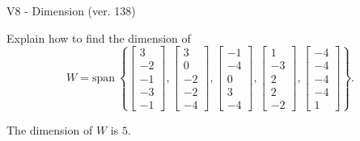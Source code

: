 \begin{exercise}
  \begin{exerciseTitle}V8 - Dimension (ver. 138)\end{exerciseTitle}
  \begin{exerciseStatement}
    Explain how to find the dimension of 
\[W=\mathrm{span}\ \left\{\left[\begin{array}{r}
3 \\
-2 \\
-1 \\
-3 \\
-1
\end{array}\right] , \left[\begin{array}{r}
3 \\
0 \\
-2 \\
-2 \\
-4
\end{array}\right] , \left[\begin{array}{r}
-1 \\
-4 \\
0 \\
3 \\
-4
\end{array}\right] , \left[\begin{array}{r}
1 \\
-3 \\
2 \\
2 \\
-2
\end{array}\right] , \left[\begin{array}{r}
-4 \\
-4 \\
-4 \\
-4 \\
1
\end{array}\right]\right\}.\]



  \end{exerciseStatement}
  \begin{exerciseAnswer}
   The dimension of \(W\) is  \(5\).
  


  \end{exerciseAnswer}
\end{exercise}